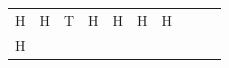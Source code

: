 {\begin{center}
\begin{xtabular*}{\mytablewidth}[t]{|p{10\mystarwidth}|p{10\mystarwidth}|p{10\mystarwidth}|p{10\mystarwidth}|p{10\mystarwidth}|p{10\mystarwidth}|p{10\mystarwidth}|p{10\mystarwidth}|p{10\mystarwidth}|p{10\mystarwidth}|}
    
        H &
    
    
        H &
    
    
        T &
    
    
        H &
    
    
        H &
    
    
        H &
    
    
        H%
     \tabularnewline{}
    
    
        H &
    
    

\end{xtabular*}
\end{center}}
